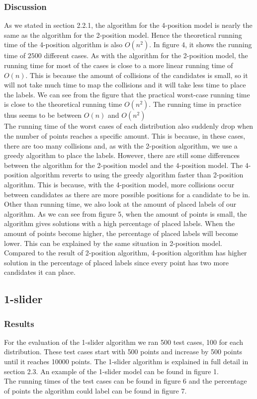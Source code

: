 \documentclass[crop=false,a4paper,oneside,11pt]{standalone}
\begin{document}
\subsubsection{Discussion}
As we stated in section 2.2.1, the algorithm for the 4-position model is nearly the same as the algorithm for the 2-position model. Hence the theoretical running time of the 4-position algorithm is also $O(n^2)$. In figure 4, it shows the running time of $2500$ different cases. As with the algorithm for the 2-position model, the running time for most of the cases is close to a more linear running time of $O(n)$. This is because the amount of collisions of the candidates is small, so it will not take much time to map the collisions and it will take less time to place the labels. We can see from the figure that the practical worst-case running time is close to the theoretical running time $O(n^2)$. The running time in practice thus seems to be between $O(n)$ and $O(n^2)$  \\
The running time of the worst cases of each distribution also suddenly drop when the number of points reaches a specific amount. This is because, in these cases, there are too many collisions and, as with the 2-position algorithm, we use a greedy algorithm to place the labels. However, there are still some differences between the algorithm for the 2-position model and the 4-position model. The 4-position algorithm reverts to using the greedy algorithm faster than 2-position algorithm. This is because, with the 4-position model, more collisions occur between candidates as there are more possible positions for a candidate to be in.\\
Other than running time, we also look at the amount of placed labels of our algorithm. As we can see from figure 5, when the amount of points is small, the algorithm gives solutions with a high percentage of placed labels. When the amount of points become higher, the percentage of placed labels will become lower. This can be explained by the same situation in 2-position model. Compared to the result of 2-position algorithm, 4-position algorithm has higher solution in the percentage of placed labels since every point has two more candidates it can place.\\


\subsection{1-slider}
\subsubsection{Results}
For the evaluation of the 1-slider algorithm we ran 500 test cases, 100 for each distribution. These test cases start with 500 points and increase by 500 points until it reaches 10000 points. The 1-slider algorithm is explained in full detail in section 2.3. An example of the 1-slider model can be found in figure 1.\\
 The running times of the test cases can be found in figure 6 and the percentage of points the algorithm could label can be found in figure 7.
\end{document}
